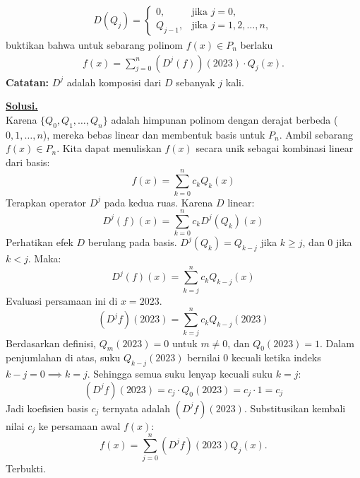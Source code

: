 \documentclass[12pt,twoside]{article}
\newenvironment{solution}
{
	\par\noindent\textbf{\underline{Solusi.}}\\
}
{
	\par
}
\begin{document}
\begin{enumerate}
        \begin{align*}
          D(Q_j)=\begin{cases}
                   0,       & \text{jika } j=0,           \\
                   Q_{j-1}, & \text{jika } j=1,2,\dots,n,
                 \end{cases}
        \end{align*}
        buktikan bahwa untuk sebarang polinom $f(x)\in P_n$ berlaku
        \begin{align*}
          f(x)=\sum_{j=0}^n (D^j(f))(2023)\cdot Q_j(x).
        \end{align*}
        \textbf{Catatan:} $D^j$ adalah komposisi dari $D$ sebanyak $j$ kali.
        \begin{solution}
          Karena $\{Q_0, Q_1, \dots, Q_n\}$ adalah himpunan polinom dengan derajat berbeda ($0, 1, \dots, n$), mereka bebas linear dan membentuk basis untuk $P_n$.
          Ambil sebarang $f(x) \in P_n$. Kita dapat menuliskan $f(x)$ secara unik sebagai kombinasi linear dari basis:
          \[ f(x) = \sum_{k=0}^n c_k Q_k(x) \]
          Terapkan operator $D^j$ pada kedua ruas. Karena $D$ linear:
          \[ D^j(f)(x) = \sum_{k=0}^n c_k D^j(Q_k)(x) \]
          Perhatikan efek $D$ berulang pada basis.
          $D^j(Q_k) = Q_{k-j}$ jika $k \ge j$, dan $0$ jika $k < j$.
          Maka:
          \[ D^j(f)(x) = \sum_{k=j}^n c_k Q_{k-j}(x) \]
          Evaluasi persamaan ini di $x = 2023$.
          \[ (D^j f)(2023) = \sum_{k=j}^n c_k Q_{k-j}(2023) \]
          Berdasarkan definisi, $Q_m(2023) = 0$ untuk $m \neq 0$, dan $Q_0(2023) = 1$.
          Dalam penjumlahan di atas, suku $Q_{k-j}(2023)$ bernilai 0 kecuali ketika indeks $k-j=0 \implies k=j$.
          Sehingga semua suku lenyap kecuali suku $k=j$:
          \[ (D^j f)(2023) = c_j \cdot Q_0(2023) = c_j \cdot 1 = c_j \]
          Jadi koefisien basis $c_j$ ternyata adalah $(D^j f)(2023)$.
          Substitusikan kembali nilai $c_j$ ke persamaan awal $f(x)$:
          \[ f(x) = \sum_{j=0}^n (D^j f)(2023) Q_j(x). \]
          Terbukti.
        \end{solution}
\end{enumerate}
\pagebreak
\end{document}
